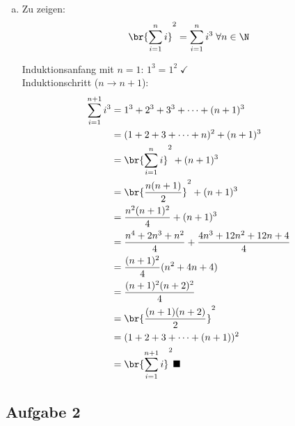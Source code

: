 \begin{enumerate}[a)]
  \item Zu zeigen: \[ \br{ \sum_{i=1}^n i }^2  = \sum_{i=1}^n i^3 \; \forall n \in \N \]

  Induktionsanfang mit $n=1$: $1^3 = 1^2 \; \checkmark$\\

  Induktionschritt ($n \to n+1$): \\

  \begin{align*}
    \sum_{i=1}^{n+1} i^3 &= 1^3 + 2^3 + 3^3 + \cdots + (n+1)^3 \\
        &= (1 + 2 + 3 + \cdots + n)^2 + (n+1)^3 \\
        &= \br{\sum_{i=1}^n i}^2 + (n+1)^3 \\
        &= \br{\frac{n(n+1)}{2}}^2 + (n+1)^3 \\
        &= \frac{n^2(n+1)^2}{4} + (n+1)^3 \\
        &= \frac{ n^4 + 2n^3 + n^2 }{ 4 } + \frac{ 4n^3 + 12n^2 + 12n + 4 }{ 4 } \\
        &= \frac{(n+1)^2}{4}(n^2 + 4n + 4) \\
        &= \frac{ (n+1)^2 (n+2)^2 }{ 4 } \\
        &= \br{ \frac{ (n+1)(n+2) }{ 2 } }^2 \\
        &= (1 + 2 + 3 + \cdots + (n+1))^2 \\
        &= \br{ \sum_{i=1}^{n+1} i }^2 \hfill \blacksquare \\
  \end{align*}

  \end{enumerate}

	\subsection*{Aufgabe 2}

